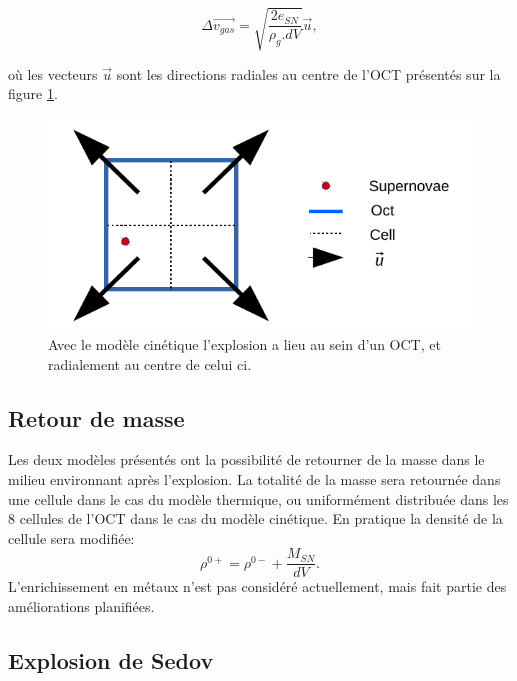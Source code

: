 \begin{equation}
    \Delta \overrightarrow{v_{gas}} = \sqrt{\frac{2e_{SN}}{\rho_g.dV}} \overrightarrow{u},
    \label{eq_sn_direct}
\end{equation}

où les vecteurs $\overrightarrow{u}$ sont les directions radiales au centre de l'OCT présentés sur la figure \ref{fig:kin}.

\begin{figure}
        \includegraphics[width=.95\linewidth]{img/03/oct_kinetic.pdf} 
        \caption[Injection d'énergie cinétique]{Avec le modèle cinétique l'explosion a lieu au sein d'un OCT, et radialement au centre de celui ci.
 		\label{fig:kin}}
\end{figure}

\subsection{Retour de masse}
Les deux modèles présentés ont la possibilité de retourner de la masse dans le milieu environnant après l'explosion.
La totalité de la masse sera retournée dans une cellule dans le cas du modèle thermique, ou uniformément distribuée dans les 8 cellules de l'OCT dans le cas du modèle cinétique.
En pratique la densité de la cellule sera modifiée:
\begin{equation}
\rho^{0+} = \rho^{0-} + \frac{M_{SN}}{dV}.
\end{equation}
L’enrichissement en métaux n'est pas considéré actuellement, mais fait partie des améliorations planifiées.
\subsection{Explosion de Sedov}
\label{sec:sedov}


